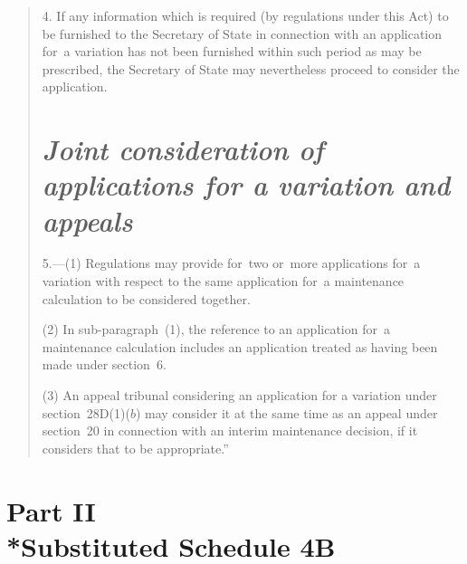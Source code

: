 \documentclass[12pt,a4paper]{article}
\begin{document}
\begin{quotation}
4. If any information which is required (by regulations under this Act) to be furnished to the Secretary of State in connection with an application for~a variation has not been furnished within such period as may be prescribed, the Secretary of State may nevertheless proceed to consider the application.

\section*{\itshape Joint consideration of applications for a variation and appeals}

5.---(1) Regulations may provide for~two or~more applications for~a variation with respect to the same application for~a maintenance calculation to be considered together.

(2) In sub-paragraph~(1), the reference to an application for~a maintenance calculation includes an application treated as having been made under section~6. 

(3) An appeal tribunal considering an application for a variation under section~28D(1)($b$)  may consider it at the same time as an appeal under section~20 in connection with an interim maintenance decision, if it considers that to be appropriate.”
\end{quotation}

\section[Part II --- Substituted Schedule 4B]{Part II\\*Substituted Schedule 4B}

\renewcommand\parthead{--- Schedule 2 Part II}
\end{document}
